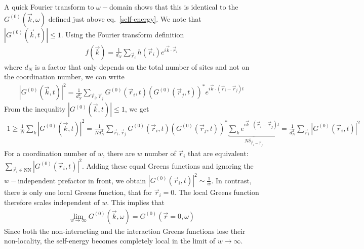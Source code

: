 \documentclass{report}
\numberwithin{equation}{section}
\begin{document}
A quick Fourier transform to \(\omega-\)domain shows that this is identical to the \(G^{(0)}(\vec k, \omega)\) defined just above eq.~\ref{self-energy}. We note that \(|G^{(0)}(\vec k, t)| \leq 1\). Using the Fourier transform  definition
\begin{equation}\begin{aligned}
	f(\vec k) = \frac{1}{d_N}\sum_{\vec r_i}h(\vec r_i) e^{i \vec{k}\cdot\vec{r}_i}
\end{aligned}\end{equation}
where \(d_N\) is a factor that only depends on the total number of sites and not on the coordination number, we can write
\begin{equation}\begin{aligned}
	|G^{(0)}(\vec k, t)|^2 = \frac{1}{d_N^2}\sum_{\vec r_i, \vec r_j} G^{(0)}(\vec r_i, t)\left(G^{(0)}(\vec r_j, t)\right)^* e^{i \vec k \cdot \left(\vec r_i - \vec r_j\right) t}
\end{aligned}\end{equation}
From the inequality \(|G^{(0)}(\vec k, t)| \leq 1\), we get
\begin{equation}\begin{aligned}
	1 \geq \frac{1}{N}\sum_k |G^{(0)}(\vec k, t)|^2 = \frac{1}{N d_N^2}\sum_{\vec r_i, \vec r_j} G^{(0)}(\vec r_i, t)\left(G^{(0)}(\vec r_j, t)\right)^* \underbrace{\sum_k e^{i \vec k \cdot \left(\vec r_i - \vec r_j\right) t}}_{N \delta_{\vec r_i = \vec r_j}} = \frac{1}{d_N^2}\sum_{\vec r_i} |G^{(0)}(\vec r_i, t)|^2
\end{aligned}\end{equation}
For a coordination number of \(w\), there are \(w\) number of \(\vec r_i\) that are equivalent: \(\sum_{\vec r_i \in \text{NN}}|G^{(0)}(\vec r_i, t)|^2\). Adding these equal Greens functions and ignoring the \(w-\)independent prefactor in front, we obtain \(|G^{(0)}(\vec r_i, t)|^2 \sim \frac{1}{w}\). In contrast, there is only one local Greens function, that for \(\vec r_i=0\). The local Greens function therefore scales independent of \(w\). This implies that 
\begin{equation}\begin{aligned}
	\lim_{w\to \infty}G^{(0)}(\vec k,\omega) = G^{(0)}(\vec r=0,\omega)
\end{aligned}\end{equation}
Since both the non-interacting and the interaction Greens functions lose their non-locality, the self-energy becomes completely local in the limit of \(w \to \infty\).
\end{document}

